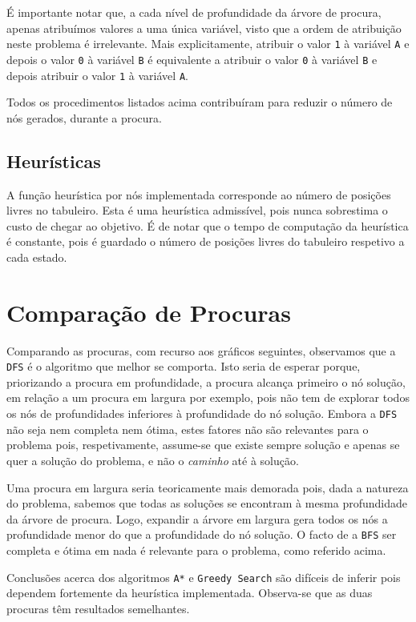 \documentclass[12pt]{article}
\begin{document}
É importante notar que, a cada nível de profundidade da árvore de procura,
apenas atribuímos valores a uma única variável, visto que a ordem de atribuição
neste problema é irrelevante. Mais explicitamente, atribuir o valor \texttt{1}
à variável \texttt{A} e depois o valor \texttt{0} à variável \texttt{B} é
equivalente a atribuir o valor \texttt{0} à variável \texttt{B} e depois atribuir
o valor \texttt{1} à variável \texttt{A}.

Todos os procedimentos listados acima contribuíram para reduzir o número de nós
gerados, durante a procura.

\subsection{Heurísticas}
A função heurística por nós implementada corresponde ao número de posições
livres no tabuleiro. Esta é uma heurística admissível, pois nunca sobrestima
o custo de chegar ao objetivo. É de notar que o tempo de computação da
heurística é constante, pois é guardado o número de posições livres do tabuleiro
respetivo a cada estado.


\section{Comparação de Procuras}

Comparando as procuras, com recurso aos gráficos seguintes, observamos que a
\texttt{DFS} é o algoritmo que melhor se comporta. Isto seria de esperar porque,
priorizando a procura em profundidade, a procura alcança primeiro o nó solução,
em relação a um procura em largura por exemplo, pois não tem de explorar todos
os nós de profundidades inferiores à profundidade do nó solução.
Embora a \texttt{DFS} não seja nem completa nem ótima, estes fatores não são
relevantes para o problema pois, respetivamente, assume-se que existe
sempre solução e apenas se quer a solução do problema, e não o \emph{caminho}
até à solução.

Uma procura em largura seria teoricamente mais demorada pois, dada a natureza do
problema, sabemos que todas as soluções se encontram à mesma profundidade da
árvore de procura. Logo, expandir a árvore em largura gera todos os nós a
profundidade menor do que a profundidade do nó solução. O facto de a \texttt{BFS}
ser completa e ótima em nada é relevante para o problema, como referido acima.

Conclusões acerca dos algoritmos \texttt{A*} e \texttt{Greedy Search} são difíceis
de inferir pois dependem fortemente da heurística implementada. Observa-se que
as duas procuras têm resultados semelhantes.
\end{document}
